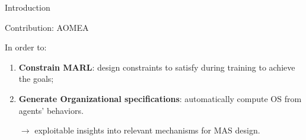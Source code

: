 \begin{frame}[allowframebreaks]{Introduction}
\begin{prosblock}{Contribution: AOMEA}
        \

        In order to:
        \begin{enumerate}
            \item \textbf{Constrain MARL}: design constraints to satisfy during training to achieve the goals;
            \item \textbf{Generate Organizational specifications}: automatically compute OS from agents' behaviors.

                  $\rightarrow$ exploitable insights into relevant mechanisms for MAS design.
        \end{enumerate}

    \end{prosblock}


\end{frame}